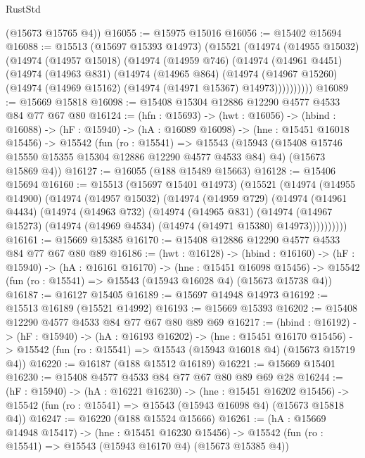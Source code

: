 \begin{lexlean}{RustStd}
\begin{coremodule}
      (@15673 @15765 @4))
@16055 := @15975 @15016
@16056 := @15402 @15694
@16088 := @15513
    (@15697 @15393 @14973)
    (@15521
      (@14974
        (@14955 @15032)
        (@14974
          (@14957 @15018)
          (@14974
            (@14959 @746)
            (@14974
              (@14961 @4451)
              (@14974
                (@14963 @831)
                (@14974
                  (@14965 @864)
                  (@14974
                    (@14967 @15260)
                    (@14974 (@14969 @15162) (@14974 (@14971 @15367) @14973))))))))))
@16089 := @15669 @15818
@16098 := @15408 @15304 @12886 @12290 @4577 @4533 @84 @77 @67 @80
@16124 := (hfn : @15693) ->
  (hwt : @16056) ->
  (hbind : @16088) ->
  (hF : @15940) ->
  (hA : @16089 @16098) ->
  (hne : @15451 @16018 @15456) ->
  @15542
    (fun (ro : @15541) =>
    @15543
      (@15943 (@15408 @15746 @15550 @15355 @15304 @12886 @12290 @4577 @4533 @84) @4)
      (@15673 @15869 @4))
@16127 := @16055 (@188 @15489 @15663)
@16128 := @15406 @15694
@16160 := @15513
    (@15697 @15401 @14973)
    (@15521
      (@14974
        (@14955 @14900)
        (@14974
          (@14957 @15032)
          (@14974
            (@14959 @729)
            (@14974
              (@14961 @4434)
              (@14974
                (@14963 @732)
                (@14974
                  (@14965 @831)
                  (@14974
                    (@14967 @15273)
                    (@14974 (@14969 @4534) (@14974 (@14971 @15380) @14973))))))))))
@16161 := @15669 @15385
@16170 := @15408 @12886 @12290 @4577 @4533 @84 @77 @67 @80 @89
@16186 := (hwt : @16128) ->
  (hbind : @16160) ->
  (hF : @15940) ->
  (hA : @16161 @16170) ->
  (hne : @15451 @16098 @15456) ->
  @15542 (fun (ro : @15541) => @15543 (@15943 @16028 @4) (@15673 @15738 @4))
@16187 := @16127 @15405
@16189 := @15697 @14948 @14973
@16192 := @15513 @16189 (@15521 @14992)
@16193 := @15669 @15393
@16202 := @15408 @12290 @4577 @4533 @84 @77 @67 @80 @89 @69
@16217 := (hbind : @16192) ->
  (hF : @15940) ->
  (hA : @16193 @16202) ->
  (hne : @15451 @16170 @15456) ->
  @15542 (fun (ro : @15541) => @15543 (@15943 @16018 @4) (@15673 @15719 @4))
@16220 := @16187 (@188 @15512 @16189)
@16221 := @15669 @15401
@16230 := @15408 @4577 @4533 @84 @77 @67 @80 @89 @69 @28
@16244 := (hF : @15940) ->
  (hA : @16221 @16230) ->
  (hne : @15451 @16202 @15456) ->
  @15542 (fun (ro : @15541) => @15543 (@15943 @16098 @4) (@15673 @15818 @4))
@16247 := @16220 (@188 @15524 @15666)
@16261 := (hA : @15669 @14948 @15417) ->
  (hne : @15451 @16230 @15456) ->
  @15542 (fun (ro : @15541) => @15543 (@15943 @16170 @4) (@15673 @15385 @4))

\end{coremodule}
\end{lexlean}
